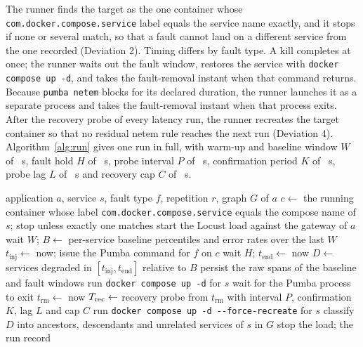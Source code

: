

The runner finds the target as the one container whose \texttt{com.docker.compose.service}
label equals the service name exactly, and it stops if none or several match, so that a fault
cannot land on a different service from the one recorded (Deviation 2). Timing differs by fault
type. A kill completes at once; the runner waits out the fault window, restores the service
with \texttt{docker compose up -d}, and takes the fault-removal instant when that command
returns. Because \texttt{pumba netem} blocks for its declared duration, the runner launches it
as a separate process and takes the fault-removal instant when that process exits. After the
recovery probe of every latency run, the runner recreates the target container so that no
residual netem rule reaches the next run (Deviation 4). Algorithm~\ref{alg:run} gives one run in
full, with warm-up and baseline window $W$ of ~s, fault hold $H$ of
~s, probe interval $P$ of ~s,
confirmation period $K$ of ~s, probe lag $L$ of
~s and recovery cap $C$ of ~s.

\begin{algorithm}[!t]
\caption{One campaign run (\texttt{one\_run} in \texttt{tools/run\_pilot.py}), called in
manifest order with a cooldown after each run}
\label{alg:run}
\begin{algorithmic}[1]
\Require application $a$, service $s$, fault type $f$, repetition $r$, graph $G$ of $a$
\State $c \gets$ the running container whose label \texttt{com.docker.compose.service}
equals the compose name of $s$; stop unless exactly one matches
\State start the Locust load against the gateway of $a$
\State wait $W$; $B \gets$ per-service baseline percentiles and error rates over the last $W$
\State $t_{\mathrm{inj}} \gets$ now; issue the Pumba command for $f$ on $c$
\State wait $H$; $t_{\mathrm{end}} \gets$ now
\State $D \gets$ services degraded in $[t_{\mathrm{inj}}, t_{\mathrm{end}}]$ relative to $B$
\State persist the raw spans of the baseline and fault windows
  \State run \texttt{docker compose up -d} for $s$
\Else
  \State wait for the Pumba process to exit
\EndIf
\State $t_{\mathrm{rm}} \gets$ now 
\State $T_{\mathrm{rec}} \gets$ recovery probe from $t_{\mathrm{rm}}$ with interval $P$, confirmation $K$,
lag $L$ and cap $C$
  \State run \texttt{docker compose up -d -{}-force-recreate} for $s$
\EndIf
\State classify $D$ into ancestors, descendants and unrelated services of $s$ in $G$
\State stop the load; \Return the run record
\end{algorithmic}
\end{algorithm}

